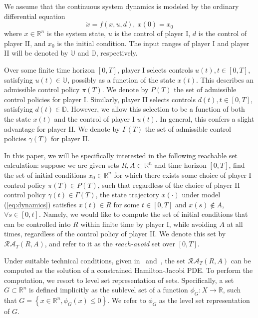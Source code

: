 We assume that the continuous system dynamics is modeled by the ordinary differential equation 
\begin{equation}
\label{eq:dynamics}
\dot{x} = f(x, u, d), \ x(0) = x_0
\end{equation}
where $x \in \mathbb{R}^n$ is the system state,  $u$ is the control of player I, $d$ is the control of player II, and $x_0$ is the initial condition.  The input ranges of player I and player II will be denoted by $\mathbb{U}$ and $\mathbb{D}$, respectively.  

Over some finite time horizon $[0, T]$, player I selects controls $u(t), t \in [0,T]$, satisfying $u(t) \in \mathbb{U}$, possibly as a function of the state $x(t)$.  This describes an admissible control policy $\pi(T)$.  We denote by $P(T)$ the set of admissible control policies for player I.   Similarly, player II selects controls $d(t), t \in [0,T]$, satisfying $d(t) \in \mathbb{D}$.  However, we allow this selection to be a function of both the state $x(t)$ and the control of player I $u(t)$.  In general, this confers a slight advantage for player II.  We denote by $\Gamma(T)$ the set of admissible control policies $\gamma(T)$ for player II.

In this paper, we will be specifically interested in the following reachable set calculation: suppose we are given sets $R, A \subset \mathbb{R}^n$ and time horizon $[0, T]$, find the set of initial conditions $x_0 \in \mathbb{R}^n$ for which there exists some choice of player I control policy $\pi(T) \in P(T)$, such that regardless of the choice of player II control policy $\gamma(t) \in \Gamma(T)$, the state trajectory $x(\cdot)$ under model (\ref{eq:dynamics}) satisfies $x(t) \in R$ for some $t \in [0,T]$ and $x(s) \notin A$, $\forall s \in [0,t]$.  Namely, we would like to compute the set of initial conditions that can be controlled into $R$ within finite time by player I, while avoiding $A$ at all times, regardless of the control policy of player II.  We denote this set by $\mathcal{RA}_T(R,A)$, and refer to it as the \emph{reach-avoid} set over $[0,T]$.

Under suitable technical conditions, given in~\cite{j:mitchell-TAC-2005} and~\cite{mitchell-thesis}, the set $\mathcal{RA}_T(R,A)$ can be computed as the solution of a constrained Hamilton-Jacobi PDE.  To perform the computation,
we resort to level set representation of sets.  Specifically, a set $G \subset \mathbb{R}^n$ is defined implicitly as the sublevel set of a function $\phi_G: X \rightarrow \mathbb{R}$, such that $G = \left\{x\in \mathbb{R}^n, \phi_G (x) \leq 0\right\}$.  We refer to $\phi_G$ as the level set representation of $G$.

